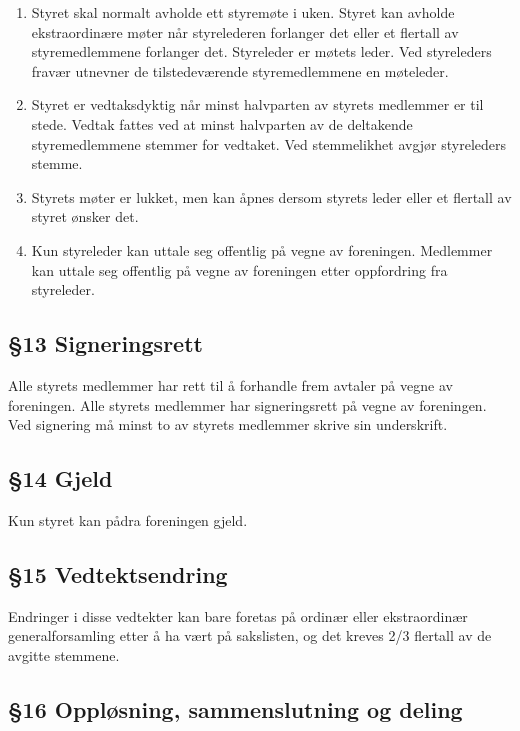 \documentclass[a4paper,11pt,titlepage]{article}
\begin{document}
\begin{enumerate}
\item Styret skal normalt avholde ett styremøte i uken. Styret kan avholde ekstraordinære møter når styrelederen forlanger det eller et flertall av styremedlemmene forlanger det. Styreleder er møtets leder. Ved styreleders fravær utnevner de tilstedeværende styremedlemmene en møteleder.

\item Styret er vedtaksdyktig når minst halvparten av styrets medlemmer er til stede. Vedtak fattes ved at minst halvparten av de deltakende styremedlemmene stemmer for vedtaket. Ved stemmelikhet avgjør styreleders stemme. 

\item Styrets møter er lukket, men kan åpnes dersom styrets leder eller et flertall av styret ønsker det.

\item Kun styreleder kan uttale seg offentlig på vegne av foreningen. Medlemmer kan uttale seg offentlig på vegne av foreningen etter oppfordring fra styreleder.

\end{enumerate}


\subsection*{§13 Signeringsrett}
Alle styrets medlemmer har rett til å forhandle frem avtaler på vegne av foreningen. Alle styrets medlemmer har signeringsrett på vegne av foreningen. Ved signering må minst to av styrets medlemmer skrive sin underskrift. 

\subsection*{§14 Gjeld}
Kun styret kan pådra foreningen gjeld.

\subsection*{§15 Vedtektsendring}
Endringer i disse vedtekter kan bare foretas på ordinær eller ekstraordinær generalforsamling etter å ha vært på sakslisten, og det kreves 2/3 flertall av de avgitte stemmene.

\subsection*{§16 Oppløsning, sammenslutning og deling}
\end{document}
